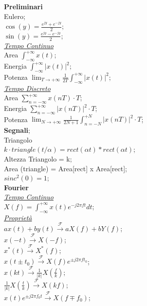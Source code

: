 \documentclass[a4paper]{article}
\begin{document}
\begin{multicols*}{3}
\textbf{Preliminari} \\
Eulero; \\
$\cos(y)=\frac{e^{jy} + e^{-jy}}{2}$; \\
$\sin(y)=\frac{e^{jy} - e^{-jy}}{2}$; \\
\underline{\textit{Tempo Continuo}} \\
Area $\int_{-\infty}^{+\infty} x(t)$; \\
Energia $\int_{-\infty}^{+\infty} |x(t)|^2$; \\
Potenza 
$\lim_{T \to +\infty}\frac{1}{2T}\int_{-\infty}^{+\infty}|x(t)|^2$; \\
\underline{\textit{Tempo Discreto}} \\
Area $\sum_{n=-\infty}^{+\infty} x(nT) \cdot T$; \\
Energia $\sum_{n=-\infty}^{+\infty}|x(nT)|^2\cdot T$; \\
Potenza
$\lim_{N \to +\infty}{\frac{1}{2N + 1}\int_{n=-N}^{+N}|x(nT)|^2\cdot T}$; \\
\textbf{Segnali}; \\
Triangolo \\
$k\cdot triangle(t/\alpha) = rect(\alpha t) * rect(\alpha t)$; \\
Altezza Triangolo = k; \\
Area (triangle) = Area[rect] x Area[rect]; \\ 
$sinc^2(0) = 1$;\\
\textbf{Fourier} \\
\underline{\textit{Tempo Continuo}} \\
$X(f) = \int_{-\infty}^{+\infty} x(t) e^{-j2\pi ft} dt$; \\
\underline{\textit{Proprietà}} \\
$ax(t) + by(t) \xrightarrow{\mathscr{F}} aX(f) + bY(f)$; \\
$x(-t) \xrightarrow{\mathscr{F}} X(-f)$; \\
$x^{*}(t) \xrightarrow{\mathscr{F}} X^{*}(f)$; \\
$x(t{\pm}t_0) \xrightarrow{\mathscr{F}} X(f)e^{{\pm}j2{\pi}f{t_0}}$; \\
$x(kt) \xrightarrow{\mathscr{F}} \frac{1}{|k|}X(\frac{f}{k})$; \\
$\frac{1}{|k|}X(\frac{t}{k}) \xrightarrow{\mathscr{F}} X(kf)$; \\
$x(t)e^{{\pm}j2{\pi}{f_0}t} \xrightarrow{\mathscr{F}} X(f{\mp}f_0)$; \\

\end{multicols*}
\end{document}
